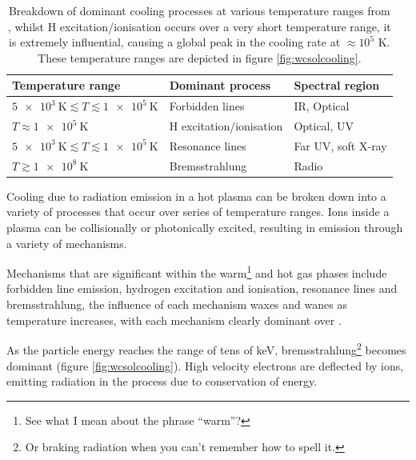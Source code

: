 \begin{table}[h]
  \centering
  \begin{tabular}{lll}
  \\ \hline 
  \textbf{Temperature range} & \textbf{Dominant process} & \textbf{Spectral region} \\ \hline
  $\SI{5e3}{\kelvin} \lesssim T \lesssim \SI{1e5}{\kelvin} $ & Forbidden lines & IR, Optical \\
  $T \approx \SI{1e5}{\kelvin}$ & H excitation/ionisation & Optical, UV \\
  $\SI{5e3}{\kelvin} \lesssim T \lesssim \SI{1e5}{\kelvin} $ & Resonance lines & Far UV, soft X-ray \\
  $T \gtrsim \SI{1e8}{\kelvin} $ & Bremsstrahlung & Radio \\ \hline
  \end{tabular}
  \caption[Cooling processes at various temperature ranges]{Breakdown of dominant cooling processes at various temperature ranges from \cite{dysonPhysicsInterstellarMedium2021}, whilst H excitation/ionisation occurs over a very short temperature range, it is extremely influential, causing a global peak in the cooling rate at $\approx 10^5$ \si{\kelvin}. These temperature ranges are depicted in figure \ref{fig:wcsolcooling}.}
  \label{tab:coolprocess}
  \end{table}


Cooling due to radiation emission in a hot plasma can be broken down into a variety of processes that occur over series of temperature ranges.
Ions inside a plasma can be collisionally or photonically excited, resulting in emission through a variety of mechanisms.

Mechanisms that are significant within the warm\footnote{See what I mean about the phrase ``warm''?} and hot gas phases include forbidden line emission, hydrogen excitation and ionisation, resonance lines and bremsstrahlung, the influence of each mechanism waxes and wanes as temperature increases, with each mechanism clearly dominant over \parencite{dysonPhysicsInterstellarMedium2021}.





As the particle energy reaches the range of tens of \si{\kilo\electronvolt}, bremsstrahlung\footnote{Or braking radiation when you can't remember how to spell it.} becomes dominant (figure \ref{fig:wcsolcooling}). High velocity electrons are deflected by ions, emitting radiation in the process due to conservation of energy. 

